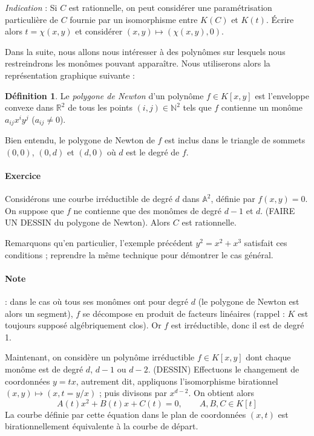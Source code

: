 \documentclass[a4paper, 11pt]{article}
\theoremstyle{definition}
\newtheorem{définition}{Définition}
\newcommand{\nat}{\mathbb{N}}
\newcommand{\real}{\mathbb{R}}
\newcommand{\aff}{\mathbb{A}}
\begin{document}
\textit{Indication} : Si $C$ est rationnelle, on peut considérer une
paramétrisation particulière de $C$ fournie par un isomorphisme entre
$K(C)$ et $K(t)$. Écrire alors $t = \chi(x,y)$ et considérer
$(x,y) \mapsto (\chi(x,y), 0)$.

Dans la suite, nous allons nous intéresser à des polynômes sur
lesquels nous restreindrons les monômes pouvant apparaître. Nous
utiliserons alors la représentation graphique suivante :
\begin{définition}
  Le \emph{polygone de Newton} d'un polynôme $f \in K[x,y]$ est
  l'enveloppe convexe dans $\real^2$ de tous les points
  $(i,j) \in \nat^2$ tels que $f$ contienne un monôme $a_{ij} x^i y^j$
  ($a_{ij} \neq 0$).
\end{définition}
Bien entendu, le polygone de Newton de $f$ est inclus dans le triangle
de sommets $(0,0)$, $(0,d)$ et $(d,0)$ où $d$ est le degré de $f$.

\paragraph{Exercice} Considérons une courbe irréductible de degré $d$
dans $\aff^2$, définie par $f(x,y)=0$. On suppose que $f$ ne contienne
que des monômes de degré $d-1$ et $d$. (FAIRE UN DESSIN du polygone de
Newton). Alors $C$ est rationnelle.

Remarquons qu'en particulier, l'exemple précédent $y^2 = x^2 + x^3$
satisfait ces conditions ; reprendre la même technique pour démontrer
le cas général.

\paragraph{Note} : dans le cas où tous ses monômes ont pour degré $d$
(le polygone de Newton est alors un segment), $f$ se décompose en
produit de facteurs linéaires (rappel : $K$ est toujours supposé
algébriquement clos). Or $f$ est irréductible, donc il est de degré 1.

Maintenant, on considère un polynôme irréductible $f \in K[x,y]$ dont
chaque monôme est de degré $d$, $d-1$ ou $d-2$. (DESSIN) Effectuons le
changement de coordonnées $y = tx$, autrement dit, appliquons
l'isomorphisme birationnel $(x,y) \mapsto (x, t = y/x)$ ; puis
divisons par $x^{d-2}$. On obtient alors
\[ A(t)x^2 + B(t)x + C(t) = 0, \qquad A,B,C \in K[t] \]
La courbe définie par cette équation dans le plan de coordonnées
$(x,t)$ est birationnellement équivalente à la courbe de départ.
\end{document}
